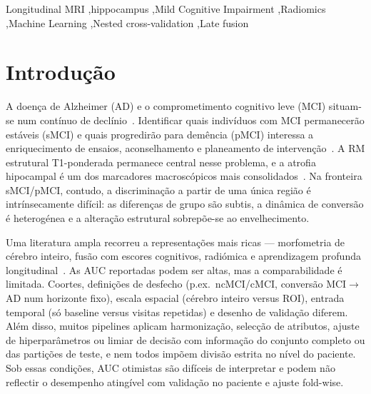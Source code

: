 \documentclass[review]{elsarticle}
\begin{document}
\begin{frontmatter}
		\begin{keyword}
			Longitudinal MRI \sep hippocampus \sep Mild Cognitive Impairment \sep Radiomics \sep Machine Learning \sep Nested cross-validation \sep Late fusion
		\end{keyword}
		
	\end{frontmatter}
	
	\section{Introdução}
	\label{sec:introducao}
	
	A doença de Alzheimer (AD) e o comprometimento cognitivo leve (MCI) situam-se num contínuo de declínio~\cite{petersen-1999}.
	Identificar quais indivíduos com MCI permanecerão estáveis (sMCI) e quais progredirão para demência (pMCI) interessa a enriquecimento de ensaios, aconselhamento e planeamento de intervenção~\cite{petersen-2009}.
	A RM estrutural T1-ponderada permanece central nesse problema, e a atrofia hipocampal é um dos marcadores macroscópicos mais consolidados~\cite{scheltens-1992}.
	Na fronteira sMCI/pMCI, contudo, a discriminação a partir de uma única região é intrínsecamente difícil: as diferenças de grupo são subtis, a dinâmica de conversão é heterogénea e a alteração estrutural sobrepõe-se ao envelhecimento.
	
	Uma literatura ampla recorreu a representações mais ricas --- morfometria de cérebro inteiro, fusão com escores cognitivos, radiómica e aprendizagem profunda longitudinal~\cite{moradi-2015,ye-2012,zhang-2019,lin-2020,aghajanian-2025}.
	As AUC reportadas podem ser altas, mas a comparabilidade é limitada.
	Coortes, definições de desfecho (p.ex.\ ncMCI/cMCI, conversão MCI$\to$AD num horizonte fixo), escala espacial (cérebro inteiro versus ROI), entrada temporal (só baseline versus visitas repetidas) e desenho de validação diferem.
	Além disso, muitos pipelines aplicam harmonização, selecção de atributos, ajuste de hiperparâmetros ou limiar de decisão com informação do conjunto completo ou das partições de teste, e nem todos impõem divisão estrita no nível do paciente.
	Sob essas condições, AUC otimistas são difíceis de interpretar e podem não reflectir o desempenho atingível com validação no paciente e ajuste fold-wise.
	
\end{document}
